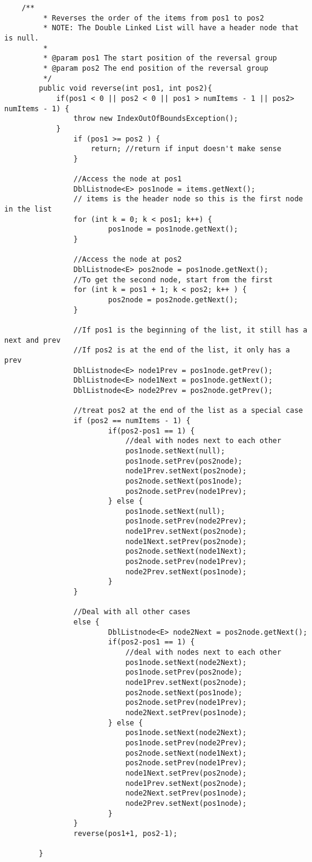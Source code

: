 \documentclass[11pt,letterpaper]{article}
\begin{document}
\begin{lstlisting}
	/**
	     * Reverses the order of the items from pos1 to pos2 
	     * NOTE: The Double Linked List will have a header node that is null.
	     * 
	     * @param pos1 The start position of the reversal group
	     * @param pos2 The end position of the reversal group
	     */
	    public void reverse(int pos1, int pos2){
	  	  	if(pos1 < 0 || pos2 < 0 || pos1 > numItems - 1 || pos2> numItems - 1) {
	  	  		throw new IndexOutOfBoundsException();
	  	  	}
	    		if (pos1 >= pos2 ) {
	    			return; //return if input doesn't make sense
	    		}
    		
	    		//Access the node at pos1
	    		DblListnode<E> pos1node = items.getNext(); 
	    		// items is the header node so this is the first node in the list
	    	    for (int k = 0; k < pos1; k++) {
	    	    		pos1node = pos1node.getNext();
	    	    }
    	    
	    	    //Access the node at pos2
	    	    DblListnode<E> pos2node = pos1node.getNext();
	    	    //To get the second node, start from the first
	    	    for (int k = pos1 + 1; k < pos2; k++ ) {
	    	    		pos2node = pos2node.getNext();
	    	    }
    	    
	    	    //If pos1 is the beginning of the list, it still has a next and prev
	    	    //If pos2 is at the end of the list, it only has a prev
	    	    DblListnode<E> node1Prev = pos1node.getPrev();
	    	    DblListnode<E> node1Next = pos1node.getNext();
	    	    DblListnode<E> node2Prev = pos2node.getPrev();
    	    
	    	    //treat pos2 at the end of the list as a special case
	    	    if (pos2 == numItems - 1) {	
	    	    		if(pos2-pos1 == 1) {
	    	    			//deal with nodes next to each other
	    	    			pos1node.setNext(null);
	    	    			pos1node.setPrev(pos2node);
	    	    			node1Prev.setNext(pos2node);
	    	    			pos2node.setNext(pos1node);
	    	    			pos2node.setPrev(node1Prev);
	    	    		} else {
	    	    			pos1node.setNext(null);
	    	    			pos1node.setPrev(node2Prev);
	    	    			node1Prev.setNext(pos2node);
	    	    			node1Next.setPrev(pos2node);
	    	    			pos2node.setNext(node1Next);
	    	    			pos2node.setPrev(node1Prev);
	    	    			node2Prev.setNext(pos1node);
	    	    		}
	    	    }
    	    
	    	    //Deal with all other cases
	    	    else {
	    	    		DblListnode<E> node2Next = pos2node.getNext();
	    	    		if(pos2-pos1 == 1) {
	    	    			//deal with nodes next to each other
	    	    			pos1node.setNext(node2Next);
	    	    			pos1node.setPrev(pos2node);
	    	    			node1Prev.setNext(pos2node);
	    	    			pos2node.setNext(pos1node);
	    	    			pos2node.setPrev(node1Prev);
	    	    			node2Next.setPrev(pos1node);
	    	    		} else {
	    	    			pos1node.setNext(node2Next);
	    	    			pos1node.setPrev(node2Prev);
	    	    			pos2node.setNext(node1Next);
	    	    			pos2node.setPrev(node1Prev);
	    	    			node1Next.setPrev(pos2node);
	    	    			node1Prev.setNext(pos2node);
	    	    			node2Next.setPrev(pos1node);
	    	    			node2Prev.setNext(pos1node);
	    	    		}
	    	    }
	    	    reverse(pos1+1, pos2-1);

	  	}
\end{lstlisting}
\end{document}
